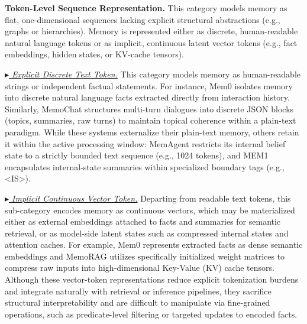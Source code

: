\noindent {} \textbf{Token-Level Sequence Representation.} This category models memory as flat, one-dimensional sequences lacking explicit structural abstractions (e.g., graphs or hierarchies). Memory is represented either as discrete, human-readable natural language tokens or as implicit, continuous latent vector tokens (e.g., fact embeddings, hidden states, or KV-cache tensors).

\noindent \underline{\textit{$\blacktriangleright$ Explicit Discrete Text Token.}}
This category models memory as human-readable strings or independent factual statements.
For instance, Mem0 isolates memory into discrete natural language facts extracted directly from interaction history. Similarly, MemoChat structures multi-turn dialogues into discrete JSON blocks (topics, summaries, raw turns) to maintain topical coherence within a plain-text paradigm. While these systems externalize their plain-text memory, others retain it within the active processing window: MemAgent restricts its internal belief state to a strictly bounded text sequence (e.g., 1024 tokens), and MEM1 encapsulates internal-state summaries within specialized boundary tags (e.g., <IS>).

\begin{sloppypar}
\noindent \underline{\textit{$\blacktriangleright$ Implicit Continuous Vector Token.}}
Departing from readable text tokens, this sub-category encodes memory as continuous vectors, which may be materialized either as external embeddings attached to facts and summaries for semantic retrieval, or as model-side latent states such as compressed internal states and attention caches.
For example, Mem0 represents extracted facts as dense semantic embeddings and MemoRAG utilizes specifically initialized weight matrices to compress raw inputs into high-dimensional Key-Value (KV) cache tensors. 
Although these vector-token representations reduce explicit tokenization burdens and integrate naturally with retrieval or inference pipelines, they sacrifice structural interpretability and are difficult to manipulate via fine-grained operations, such as predicate-level filtering or targeted updates to encoded facts.
\end{sloppypar}


